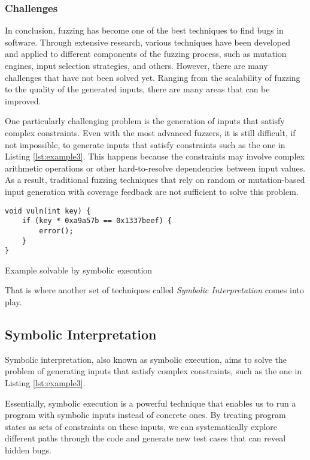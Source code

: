 \subsubsection{Challenges} \label{fuzzing:challenges}

In conclusion, fuzzing has become one of the best techniques to find bugs in software. Through extensive research, various techniques have been developed and applied to different components of the fuzzing process, such as mutation engines, input selection strategies, and others. However, there are many challenges that have not been solved yet. Ranging from the scalability of fuzzing to the quality of the generated inputs, there are many areas that can be improved.

One particularly challenging problem is the generation of inputs that satisfy complex constraints. Even with the most advanced fuzzers, it is still difficult, if not impossible, to generate inputs that satisfy constraints such as the one in Listing \ref{lst:example3}. This happens because the constraints may involve complex arithmetic operations or other hard-to-resolve dependencies between input values. As a result, traditional fuzzing techniques that rely on random or mutation-based input generation with coverage feedback are not sufficient to solve this problem.

\begin{listing}[htp]
	\centering
	\begin{minipage}{.6\linewidth}
		\begin{verbatim}
void vuln(int key) {
	if (key * 0xa9a57b == 0x1337beef) {
		error();
	}
}
		\end{verbatim}
	\end{minipage}
	\caption{Example solvable by symbolic execution}
	\label{lst:example3}
\end{listing}

That is where another set of techniques called \textit{Symbolic Interpretation} comes into play.

\subsection{Symbolic Interpretation}

Symbolic interpretation, also known as symbolic execution, aims to solve the problem of generating inputs that satisfy complex constraints, such as the one in Listing \ref{lst:example3}.

Essentially, symbolic execution is a powerful technique that enables us to run a program with symbolic inputs instead of concrete ones. By treating program states as sets of constraints on these inputs, we can systematically explore different paths through the code and generate new test cases that can reveal hidden bugs.

